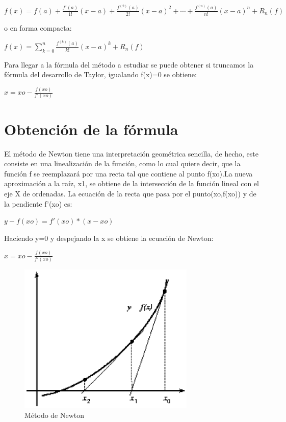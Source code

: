 \centerline{$ f(x) = f(a) + \frac{f'(a)}{1!}(x - a) + \frac{f^{(2)}(a)}{2!}(x - a)^2 + \cdots + \frac{f^{(n)}(a)}{n!}(x - a)^n + R_n(f)$} 
\vspace{1cm}

o en forma compacta:\\

\centerline{$ f(x) = \sum_{k=0}^n \frac{f^{(k)}(a)}{k!}(x - a)^k + R_n(f) $}
\vspace{1cm}


Para llegar a la fórmula del método a estudiar se puede obtener si truncamos la fórmula del desarrollo de Taylor, igualando f(x)=0 se obtiene:\\

\centerline{$ x=xo-\frac{f(xo)}{f'(xo)} $}
\vspace{1cm}


\section{Obtención de la fórmula}
El método de Newton tiene una interpretación geométrica sencilla, de hecho, este consiste en una linealización de la función, como lo cual quiere decir, que la función f se reemplazará por una recta
tal que contiene al punto f(xo).La nueva aproximación a la raíz, x1, se obtiene de la intersección de la función lineal con el eje X de ordenadas.
La ecuación de la recta que pasa por el punto(xo,f(xo)) y de la pendiente f'(xo) es:\\
\centerline{$ y-f(xo)=f'(xo)*(x-xo) $}
Haciendo y=0 y despejando la x se obtiene la ecuación de Newton: \\
\centerline{$ x=xo-\frac{f(xo)}{f'(xo)} $}

\begin{figure}[!th]
\begin{center}
\includegraphics[width=0.75\textwidth]{images/a.eps}
\caption{Método de Newton}
\end{center}
\end{figure}

